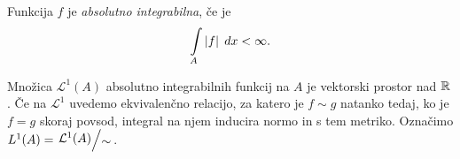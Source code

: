 \obvs

\begin{definicija}
Funkcija $f$ je
\emph{absolutno integrabilna},
če je
\[
\int\limits_A \left\lvert f\right\rvert\;dx < \infty.
\]
\end{definicija}

\begin{opomba}
Množica $\mathcal{L}^1(A)$ absolutno integrabilnih funkcij na $A$
je vektorski prostor nad $\mathbb{R}$. Če na $\mathcal{L}^1$ uvedemo
ekvivalenčno relacijo, za katero je $f \sim g$ natanko tedaj, ko je
$f = g$ skoraj povsod, integral na njem inducira normo in s tem
metriko. Označimo $L^1(A) = \kvoc{\mathcal{L}^1(A)}{\sim}$.
\end{opomba}
